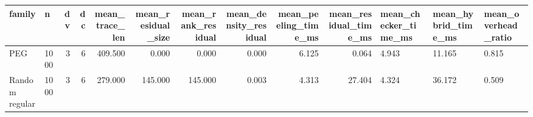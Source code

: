 \begin{tabular}{llrrrrrrrr}
\toprule
family & n & dv & dc & mean_trace_len & mean_residual_size & mean_rank_residual & mean_density_residual & mean_peeling_time_ms & mean_residual_time_ms & mean_checker_time_ms & mean_hybrid_time_ms & mean_overhead_ratio \\
\midrule
PEG & 1000 & 3 & 6 & 409.500 & 0.000 & 0.000 & 0.000 & 6.125 & 0.064 & 4.943 & 11.165 & 0.815 \\
Random regular & 1000 & 3 & 6 & 279.000 & 145.000 & 145.000 & 0.003 & 4.313 & 27.404 & 4.324 & 36.172 & 0.509 \\
\bottomrule
\end{tabular}

